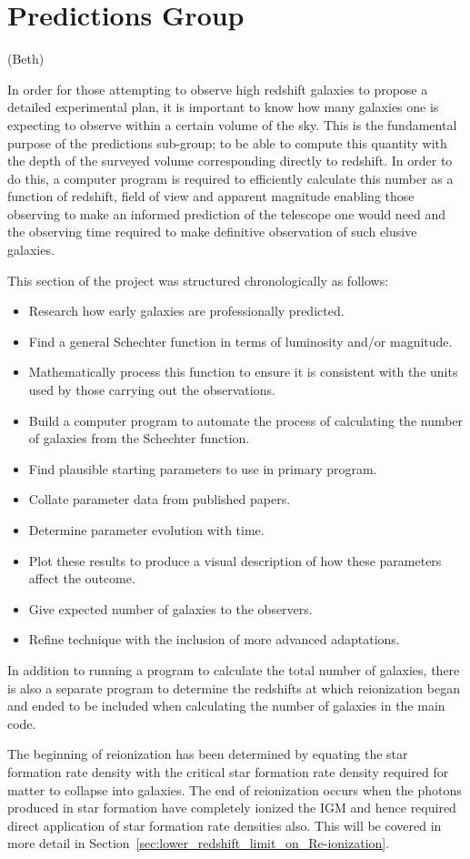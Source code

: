 
\section{Predictions Group} %
\label{sec:predictions_group}
(Beth)

	In order for those attempting to observe high redshift galaxies to propose a detailed experimental plan, it is important to know how many galaxies one is expecting to observe within a certain volume of the sky. This is the fundamental purpose of the predictions sub-group; to be able to compute this quantity with the depth of the surveyed volume corresponding directly to redshift. In order to do this, a computer program is required to efficiently calculate this number as a function of redshift, field of view and apparent magnitude enabling those observing to make an informed prediction of the telescope one would need and the observing time required to make definitive observation of such elusive galaxies.

	This section of the project was structured chronologically as follows:
	\begin{itemize}
		\item Research how early galaxies are professionally predicted.
		\item Find a general Schechter function in terms of luminosity and/or magnitude.
		\item Mathematically process this function to ensure it is consistent with the units used by those carrying out the observations.
		\item Build a computer program to automate the process of calculating the number of galaxies from the Schechter function.
		\item Find plausible starting parameters to use in primary program.
		\item Collate parameter data from published papers.
		\item Determine parameter evolution with time.
		\item Plot these results to produce a visual description of how these parameters affect the outcome.
		\item Give expected number of galaxies to the observers.
		\item Refine technique with the inclusion of more advanced adaptations.
	\end{itemize}

	In addition to running a program to calculate the total number of galaxies, there is also a separate program to determine the redshifts at which reionization began and ended to be included when calculating the number of galaxies in the main code.

	The beginning of reionization has been determined by equating the star formation rate density with the critical star formation rate density required for matter to collapse into galaxies. The end of reionization occurs when the photons produced in star formation have completely ionized the IGM and hence required direct application of star formation rate densities also. This will be covered in more detail in Section~\ref{sec:lower_redshift_limit_on_Re-ionization}.

